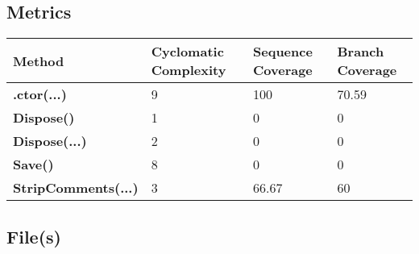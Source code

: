 \documentclass[a4paper,10pt]{article}
\begin{document}
\subsection{Metrics}
\begin{longtable}[l]{|l|l|l|l|}
\hline
\textbf{Method} & \textbf{Cyclomatic Complexity} & \textbf{Sequence Coverage} & \textbf{Branch Coverage}\\
\hline
\textbf{.ctor(...)} & 9 & 100 & 70.59\\
\hline
\textbf{Dispose()} & 1 & 0 & 0\\
\hline
\textbf{Dispose(...)} & 2 & 0 & 0\\
\hline
\textbf{Save()} & 8 & 0 & 0\\
\hline
\textbf{StripComments(...)} & 3 & 66.67 & 60\\
\hline
\end{longtable}
\subsection{File(s)}
\end{document}
